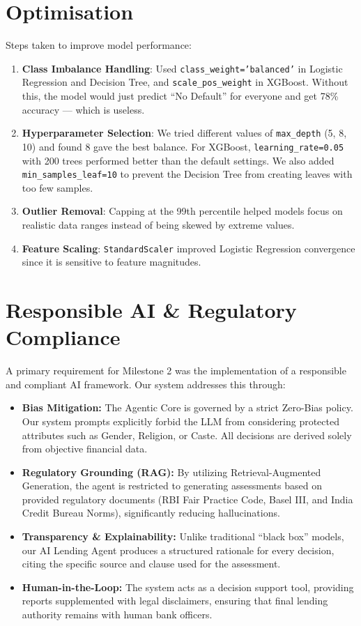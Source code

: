 \documentclass[12pt, a4paper]{article}
\begin{document}
\section{Optimisation}

Steps taken to improve model performance:

\begin{enumerate}[leftmargin=2cm]
  \item \textbf{Class Imbalance Handling}: Used \texttt{class\_weight='balanced'} in Logistic Regression and Decision Tree, and \texttt{scale\_pos\_weight} in XGBoost. Without this, the model would just predict ``No Default'' for everyone and get 78\% accuracy --- which is useless.
  \item \textbf{Hyperparameter Selection}: We tried different values of \texttt{max\_depth} (5, 8, 10) and found 8 gave the best balance. For XGBoost, \texttt{learning\_rate=0.05} with 200 trees performed better than the default settings. We also added \texttt{min\_samples\_leaf=10} to prevent the Decision Tree from creating leaves with too few samples.
  \item \textbf{Outlier Removal}: Capping at the 99th percentile helped models focus on realistic data ranges instead of being skewed by extreme values.
\item \textbf{Feature Scaling}: \texttt{StandardScaler} improved Logistic Regression convergence since it is sensitive to feature magnitudes.
\end{enumerate}

\section{Responsible AI \& Regulatory Compliance}

A primary requirement for Milestone 2 was the implementation of a responsible and compliant AI framework. Our system addresses this through:

\begin{itemize}[leftmargin=2cm]
  \item \textbf{Bias Mitigation:} The Agentic Core is governed by a strict Zero-Bias policy. Our system prompts explicitly forbid the LLM from considering protected attributes such as Gender, Religion, or Caste. All decisions are derived solely from objective financial data.
  \item \textbf{Regulatory Grounding (RAG):} By utilizing Retrieval-Augmented Generation, the agent is restricted to generating assessments based on provided regulatory documents (RBI Fair Practice Code, Basel III, and India Credit Bureau Norms), significantly reducing hallucinations.
  \item \textbf{Transparency \& Explainability:} Unlike traditional ``black box'' models, our AI Lending Agent produces a structured rationale for every decision, citing the specific source and clause used for the assessment.
  \item \textbf{Human-in-the-Loop:} The system acts as a decision support tool, providing reports supplemented with legal disclaimers, ensuring that final lending authority remains with human bank officers.
\end{itemize}
\end{document}
